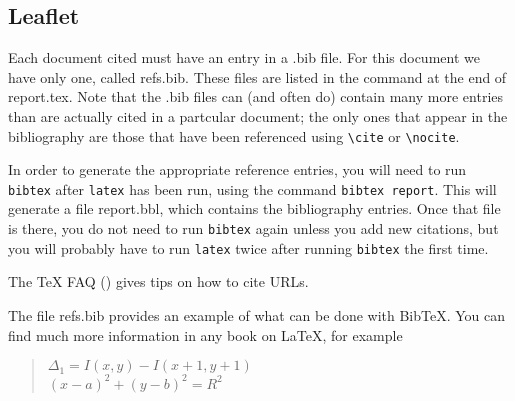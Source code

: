 \subsection{Leaflet}


Each document cited must have an entry in a \textsf{.bib} file. For this
document we have only one, called \textsf{refs.bib}. These files are
listed in the \verb== command at the end of
\textsf{report.tex}. Note that the \textsf{.bib} files can (and often
do) contain many more entries than are actually cited in a partcular
document; the only ones that appear in the bibliography are those that
have been referenced using \verb=\cite= or \verb=\nocite=.

In order to generate the appropriate reference entries, you will need
to run \texttt{bibtex} after \texttt{latex} has been run, using the
command \texttt{bibtex report}. This will generate a file
\textsf{report.bbl}, which contains the bibliography entries. Once
that file is there, you do not need to run \texttt{bibtex} again
unless you add new citations, but you will probably have to run
\texttt{latex} twice after running \texttt{bibtex} the first time.

The \TeX{} FAQ (\cite{url-cite}) gives tips on how to cite URLs.

The file \textsf{refs.bib} provides an example of what can be done
with Bib\TeX. You can find much more information in any book on
\LaTeX, for example \cite{lamport,companion,kopka}



\begin{quote}
\centering
$\Delta_1=I(x,y)-I(x+1,y+1)$ \\
$(x-a)^2+(y-b)^2=R^2$
\end{quote}